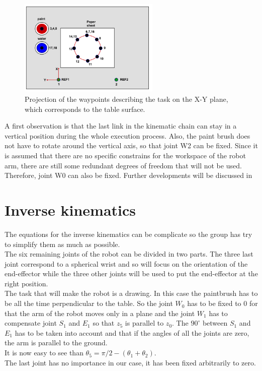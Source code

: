 \begin{figure}[!ht]
	\centering
    \includegraphics[width = 0.6\textwidth]{Images/Task}
    \caption{Projection of the waypoints describing the task on the X-Y plane, which corresponds to the table surface.}
    \label{fig:Task}
\end{figure}

\bigskip
A first observation is that the last link in the kinematic chain can stay in a vertical position during the whole execution process. Also, the paint brush does not have to rotate around the vertical axis, so that joint W2 can be fixed. Since it is assumed that there are no specific constrains for the workspace of the robot arm, there are still some redundant degrees of freedom that will not be used. Therefore, joint W0 can also be fixed. Further developments will be discussed in


\section{Inverse kinematics}
\label{sec: inv}
The equations for the inverse kinematics can be complicate so the group has try to simplify them as much as possible.\\
The six remaining joints of the robot can be divided in two parts. The three last joint correspond to a spherical wrist and so will focus on the orientation of the end-effector while the three other joints will be used to put the end-effector at the right position.\\

The task that will make the robot is a drawing. In this case the paintbrush has to be all the time perpendicular to the table. So the joint $W_0$ has to be fixed to 0 for that the arm of the robot moves only in a plane and the joint $W_1$ has to compensate joint $S_1$ and $E_1$ so that $z_5$ is parallel to $z_0$. The $90^{\circ}$ between $S_1$ and $E_1$ has to be taken into account and that if the angles of all the joints are zero, the arm is parallel to the ground.\\
It is now easy to see than $\theta_5 = \pi /2 - (\theta_1 + \theta_2)$. \\
The last joint has no importance in our case, it has been fixed arbitrarily to zero.\\

